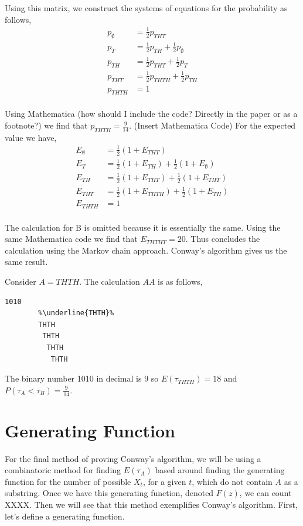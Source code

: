 \documentclass{article}
\numberwithin{mytheorem}{subsection} %
\begin{document}
		Using this matrix, we construct the systems of equations for the probability as follows,
		\begin{equation} 	
		\begin{split}
		p_{\emptyset} & = \frac{1}{2} p_{THT} \\
		p_{T} & = \frac{1}{2} p_{TH} + \frac{1}{2} p_{\emptyset} \\
		p_{TH} & = \frac{1}{2} p_{THT} + \frac{1}{2} p_T \\
		p_{THT} & = \frac{1}{2} p_{THTH} + \frac{1}{2} p_{TH} \\
		p_{THTH} & = 1 \\
		\end{split}
		\end{equation}

		Using Mathematica (how should I include the code? Directly in the paper or as a footnote?) we find that $p_{THTH} = \frac{9}{14}$. (Insert Mathematica Code) For the expected value we have,
		\begin{equation} 	
		\begin{split}
		E_{\emptyset} & = \frac{1}{2} (1 + E_{THT}) \\
		E_{T} & = \frac{1}{2} (1 + E_{TH}) + \frac{1}{2} (1 + E_{\emptyset}) \\
		E_{TH} & = \frac{1}{2} (1 + E_{THT}) + \frac{1}{2} (1 + E_{THT}) \\
		E_{THT} & = \frac{1}{2} (1 + E_{THTH}) + \frac{1}{2} (1 + E_{TH}) \\
		E_{THTH} & = 1 \\
		\end{split}
		\end{equation}

		The calculation for B is omitted because it is essentially the same. Using the same Mathematica code we find that $E_{THTHT} = 20$. Thus concludes the calculation using the Markov chain approach. Conway's algorithm gives us the same result. 

		Consider $A = THTH$. The calculation $AA$ is as follows,   
		\begin{lstlisting}[escapechar=\%]
		1010 
		%\underline{THTH}%
		THTH
		 THTH
		  THTH 
		   THTH 
		\end{lstlisting}

		The binary number 1010 in decimal is 9 so $E(\tau_{THTH}) = 18$ and $P(\tau_A < \tau_B) = \frac{9}{14}$.

		
	\section{Generating Function}
		For the final method of proving Conway's algorithm, we will be using a combinatoric method for finding $E(\tau_A)$ based around finding the generating function for the number of possible $X_t$, for a given $t$, which do not contain $A$ as a substring. Once we have this generating function, denoted $F(z)$, we can count XXXX. Then we will see that this method exemplifies Conway's algorithm. First, let's define a generating function. 
\end{document}

